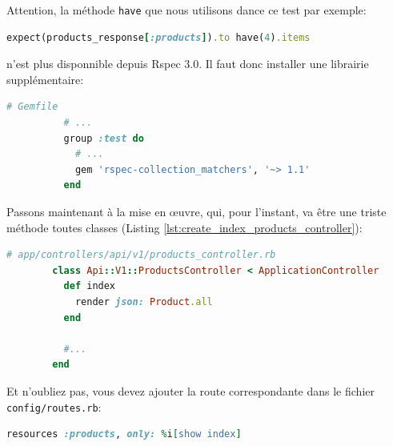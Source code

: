 \documentclass[]{report}
\begin{document}
      \begin{tcolorbox}
        Attention, la méthode \verb|have| que nous utilisons dance ce test par exemple:

        \begin{scriptsize}
          \begin{lstlisting}[language=ruby]
          expect(products_response[:products]).to have(4).items
          \end{lstlisting}
        \end{scriptsize}

        n'est plus disponnible depuis Rspec 3.0. Il faut donc installer une librairie supplémentaire:

        \begin{scriptsize}
          \begin{lstlisting}[language=ruby]
          # Gemfile
          # ...
          group :test do
            # ...
            gem 'rspec-collection_matchers', '~> 1.1'
          end
          \end{lstlisting}
        \end{scriptsize}


      \end{tcolorbox}

      Passons maintenant à la mise en œuvre, qui, pour l'instant, va être une triste méthode toutes classes (Listing \ref{lst:create_index_products_controller}):

      \begin{scriptsize}
        \begin{lstlisting}[language=ruby, caption={Méthode d'affichage des produits}, label={lst:create_index_products_controller}]
        # app/controllers/api/v1/products_controller.rb
        class Api::V1::ProductsController < ApplicationController
          def index
            render json: Product.all
          end

          #...
        end
        \end{lstlisting}
      \end{scriptsize}

      Et n'oubliez pas, vous devez ajouter la route correspondante dans le fichier \verb|config/routes.rb|:

      \begin{scriptsize}
        \begin{lstlisting}[language=ruby]
        resources :products, only: %i[show index]
        \end{lstlisting}
      \end{scriptsize}
\end{document}
